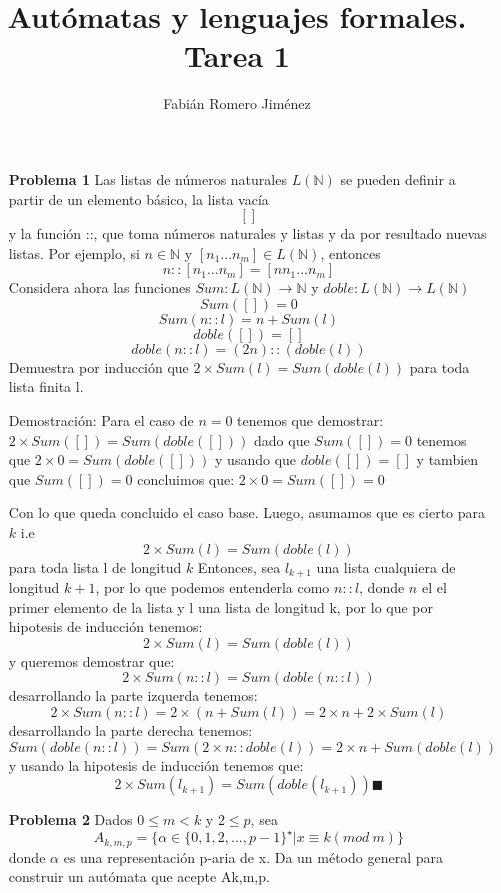 \documentclass{article}
\title{Autómatas y lenguajes formales. Tarea 1}
\author{Fabián Romero Jiménez}
\begin{document}
\maketitle
\begin{enumerate}
\item[\bf{Problema 1}] Las listas de números naturales $L( \mathbb{N} )$ se pueden definir a partir de un elemento básico, la lista vacía
$$ [ ] $$
y la función ::, que toma números naturales y listas y da por resultado nuevas listas. Por ejemplo, si $ n \in \mathbb{N}$ y $[n_{1} . . . n_{m}] \in L(\mathbb{N}) $, entonces $$ n :: [n_{1} . . . n_{m}] = [n n_{1} . . . n_{m}] $$
Considera ahora las funciones $ Sum : L(\mathbb{N}) \rightarrow \mathbb{N} $ y $ doble : L(\mathbb{N}) \rightarrow L(\mathbb{N}) $
$$ Sum([ ]) = 0     $$
$$ Sum(n :: l) = n + Sum(l)   $$
$$ doble([ ]) = [ ] $$
$$ doble(n :: l) = (2  n) :: (doble(l)) $$
Demuestra por inducción que $ 2 \times Sum(l) = Sum(doble(l))$ para toda lista finita l.

\item[Demostración:]
Para el caso de $n = 0$ tenemos que demostrar:
$  2 \times Sum([]) = Sum(doble([]))  $
dado que $ Sum([ ]) = 0  $ tenemos que $  2 \times 0 = Sum(doble([]))  $
y usando que $ doble([ ]) = [ ] $ y tambien que $ Sum([ ]) = 0  $
concluimos que: $  2 \times 0 = Sum([])= 0 $

Con lo que queda concluido el caso base.
Luego, asumamos que es cierto para  $k$
i.e
$$  2 \times Sum(l) = Sum(doble(l)) $$ para toda lista l de longitud $k$
Entonces, sea $l_{k+1}$ una lista cualquiera de longitud $k+1$, por lo que podemos entenderla como $n::l$, donde $n$ el el primer elemento de la lista y l una lista de longitud k, por lo que por hipotesis de inducción tenemos:
$$  2 \times Sum(l) = Sum(doble(l))  $$
y queremos demostrar que:
$$  2 \times Sum(n::l) = Sum(doble(n::l))  $$
desarrollando la parte izquerda tenemos:
$$ 2 \times Sum(n::l) = 2 \times (n + Sum(l))=2 \times n + 2 \times Sum(l) $$
desarrollando la parte derecha tenemos:
$$ Sum(doble(n::l)) = Sum(2 \times n :: doble(l)) = 2 \times n + Sum (doble(l)) $$
y usando la hipotesis de inducción tenemos que:
$$ 2 \times Sum(l_{k+1}) = Sum(doble(l_{k+1}))   \blacksquare$$

\item[\bf{Problema 2}] Dados $0 \le m < k$ y $2 \le p$, sea
$$A_{k,m,p} = \{\alpha \in \{0,1,2,...,p-1\}^\star | x \equiv k (mod\ m) \}$$ donde $\alpha$ es una representación p-aria de x.
Da un método general para construir un autómata que acepte Ak,m,p.


\end{enumerate}
\end{document}
